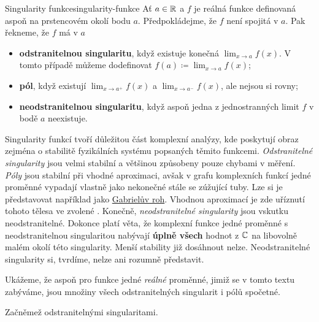 \begin{example}{Singularity funkce}{singularity-funkce}
 Ať $a \in \mathbb{R}$ a $f$ je reálná funkce definovaná aspoň na prstencovém okolí bodu
 $a$. Předpokládejme, že $f$ není spojitá v $a$. Pak řekneme, že $f$ má v $a$
 \begin{itemize}
  \item \textbf{odstranitelnou singularitu}, když existuje konečná
   $\lim_{x \to a} f(x)$. V tomto případě můžeme dodefinovat $f(a) \coloneqq
   \lim_{x \to a} f(x)$;
  \item \textbf{pól}, když existují $\lim_{x \to a^{+}} f(x)$ a
   $\lim_{x \to a^{-}} f(x)$, ale nejsou si rovny;
  \item \textbf{neodstranitelnou singularitu}, když aspoň jedna z jednostranných
   limit $f$ v bodě $a$ neexistuje.
 \end{itemize}
 Singularity funkcí tvoří důležitou část komplexní analýzy, kde poskytují obraz
 zejména o stabilitě fyzikálních systému popsaných těmito funkcemi.
 \emph{Odstranitelné singularity} jsou velmi stabilní a většinou způsobeny pouze
 chybami v měření. \emph{Póly} jsou stabilní při vhodné aproximaci, avšak v
 grafu komplexních funkcí jedné proměnné vypadají vlastně jako nekonečné stále
 se zúžující tuby. Lze si je představovat například jako
 \href{https://cs.wikipedia.org/wiki/Gabriel%C5%AFv_roh}{Gabrielův roh}. Vhodnou
  aproximací je zde uříznutí tohoto tělesa ve zvolené . Konečně,
  \emph{neodstranitelné singularity} jsou vskutku neodstranitelné. Dokonce platí
  věta, že komplexní funkce jedné proměnné s neodstranitelnou singularitou
  nabývají \textbf{úplně všech} hodnot z $\mathbb{C}$ na libovolně malém okolí této
  singularity. Menší stability již dosáhnout nelze. Neodstranitelné singularity
  si, tvrdíme, nelze ani rozumně představit.

 Ukážeme, že aspoň pro funkce jedné \emph{reálné} proměnné, jimiž se v tomto
 textu zabýváme, jsou množiny všech odstranitelných singularit i pólů spočetné.

 Začněmež odstranitelnými singularitami. 
\end{example}
